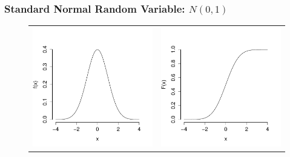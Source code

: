 \documentclass[handout]{beamer}
\begin{document}
\begin{frame}
  \frametitle{Standard Normal Random Variable: $N(0,1)$}
\begin{figure}[h]
  \centering
  \begin{tabular}{cc}
  \includegraphics[scale = 0.3]{./images/std_normal_PDF}
  &  
  \includegraphics[scale = 0.3]{./images/std_normal_CDF}

\end{tabular}
\end{figure}
\end{frame}
\end{document}
